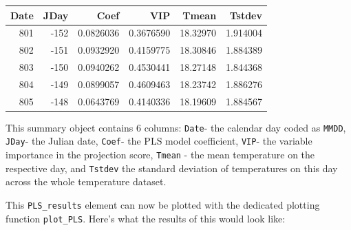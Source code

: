 \documentclass[
]{book}
\newenvironment{Shaded}{\begin{snugshade}}{\end{snugshade}}
\newcommand{\DataTypeTok}[1]{\textcolor[rgb]{0.13,0.29,0.53}{#1}}
\newcommand{\DecValTok}[1]{\textcolor[rgb]{0.00,0.00,0.81}{#1}}
\newcommand{\KeywordTok}[1]{\textcolor[rgb]{0.13,0.29,0.53}{\textbf{#1}}}
\newcommand{\NormalTok}[1]{#1}
\newcommand{\OperatorTok}[1]{\textcolor[rgb]{0.81,0.36,0.00}{\textbf{#1}}}
\newcommand{\StringTok}[1]{\textcolor[rgb]{0.31,0.60,0.02}{#1}}
\begin{document}
\begin{Shaded}
\end{Shaded}

\begingroup\fontsize{8}{10}\selectfont

\begin{tabular}{r|r|r|r|r|r}
\hline
Date & JDay & Coef & VIP & Tmean & Tstdev\\
\hline
801 & -152 & 0.0826036 & 0.3676590 & 18.32970 & 1.914004\\
\hline
802 & -151 & 0.0932920 & 0.4159775 & 18.30846 & 1.884389\\
\hline
803 & -150 & 0.0940262 & 0.4530441 & 18.27148 & 1.844368\\
\hline
804 & -149 & 0.0899057 & 0.4609463 & 18.23742 & 1.886276\\
\hline
805 & -148 & 0.0643769 & 0.4140336 & 18.19609 & 1.884567\\
\hline
\end{tabular}
\endgroup{}

This summary object contains 6 columns: \texttt{Date}- the calendar day coded as \texttt{MMDD}, \texttt{JDay}- the Julian date, \texttt{Coef}- the PLS model coefficient, \texttt{VIP}- the variable importance in the projection score, \texttt{Tmean} - the mean temperature on the respective day, and \texttt{Tstdev} the standard deviation of temperatures on this day across the whole temperature dataset.

This \texttt{PLS\_results} element can now be plotted with the dedicated plotting function \texttt{plot\_PLS}. Here's what the results of this would look like:
\end{document}
